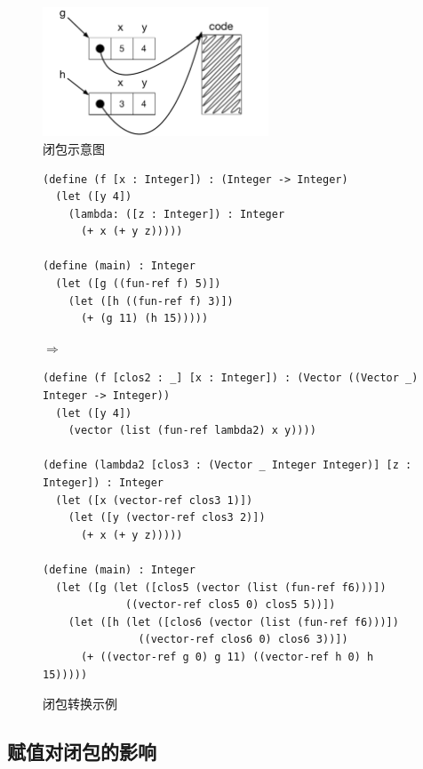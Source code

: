 \begin{figure}[t]
\centering \includegraphics[width=0.6\textwidth]{figures/closures}
\caption{闭包示意图}
\label{fig:closure-eg}
\end{figure}

\begin{figure}[tbp]
  \begin{minipage}{0.8\textwidth}
\begin{lstlisting}[basicstyle=\ttfamily\footnotesize]
(define (f [x : Integer]) : (Integer -> Integer)
  (let ([y 4])
    (lambda: ([z : Integer]) : Integer
      (+ x (+ y z)))))

(define (main) : Integer
  (let ([g ((fun-ref f) 5)])
    (let ([h ((fun-ref f) 3)])
      (+ (g 11) (h 15)))))
\end{lstlisting}
$\Rightarrow$
\begin{lstlisting}[basicstyle=\ttfamily\footnotesize]
(define (f [clos2 : _] [x : Integer]) : (Vector ((Vector _) Integer -> Integer))
  (let ([y 4])
    (vector (list (fun-ref lambda2) x y))))

(define (lambda2 [clos3 : (Vector _ Integer Integer)] [z : Integer]) : Integer
  (let ([x (vector-ref clos3 1)])
    (let ([y (vector-ref clos3 2)])
      (+ x (+ y z)))))

(define (main) : Integer
  (let ([g (let ([clos5 (vector (list (fun-ref f6)))])
             ((vector-ref clos5 0) clos5 5))])
    (let ([h (let ([clos6 (vector (list (fun-ref f6)))])
               ((vector-ref clos6 0) clos6 3))])
      (+ ((vector-ref g 0) g 11) ((vector-ref h 0) h 15)))))
\end{lstlisting}
\end{minipage}

\caption{闭包转换示例}
\label{fig:colure-conversion-eg}
\end{figure}


\subsection{赋值对闭包的影响}


